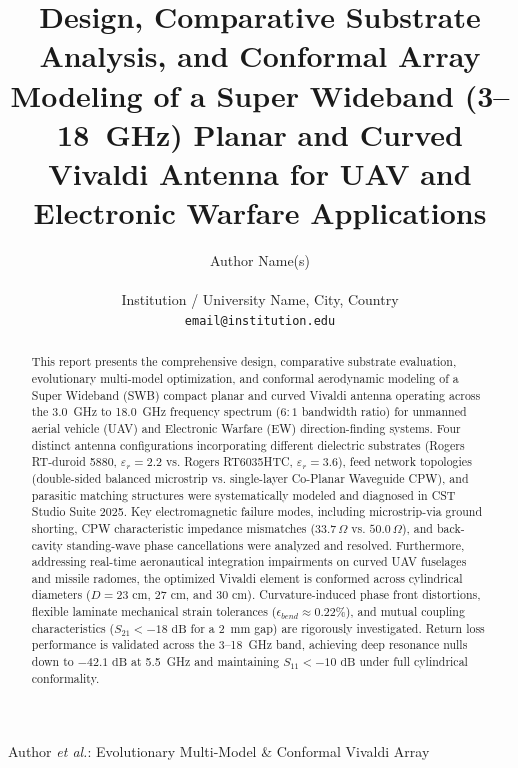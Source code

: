 \documentclass[journal,compsoc,twocolumn,10pt]{IEEEtran}
\begin{document}
\title{Design, Comparative Substrate Analysis, and Conformal Array Modeling of a Super Wideband (3--18~GHz) Planar and Curved Vivaldi Antenna for UAV and Electronic Warfare Applications}

\author{Author Name(s) \\
 \\
Institution / University Name, City, Country \\
\texttt{email@institution.edu}
}

%
{Author \MakeLowercase{\textit{et al.}}: Evolutionary Multi-Model & Conformal Vivaldi Array}

\maketitle

\begin{abstract}
This report presents the comprehensive design, comparative substrate evaluation, evolutionary multi-model optimization, and conformal aerodynamic modeling of a Super Wideband (SWB) compact planar and curved Vivaldi antenna operating across the 3.0~GHz to 18.0~GHz frequency spectrum ($6:1$ bandwidth ratio) for unmanned aerial vehicle (UAV) and Electronic Warfare (EW) direction-finding systems. Four distinct antenna configurations incorporating different dielectric substrates (Rogers RT-duroid 5880, $\varepsilon_r = 2.2$ vs. Rogers RT6035HTC, $\varepsilon_r = 3.6$), feed network topologies (double-sided balanced microstrip vs. single-layer Co-Planar Waveguide CPW), and parasitic matching structures were systematically modeled and diagnosed in CST Studio Suite 2025. Key electromagnetic failure modes, including microstrip-via ground shorting, CPW characteristic impedance mismatches ($33.7\,\Omega$ vs. $50.0\,\Omega$), and back-cavity standing-wave phase cancellations were analyzed and resolved. Furthermore, addressing real-time aeronautical integration impairments on curved UAV fuselages and missile radomes, the optimized Vivaldi element is conformed across cylindrical diameters ($D = 23\text{ cm}$, $27\text{ cm}$, and $30\text{ cm}$). Curvature-induced phase front distortions, flexible laminate mechanical strain tolerances ($\epsilon_{bend} \approx 0.22\%$), and mutual coupling characteristics ($S_{21} < -18\text{ dB}$ for a 2~mm gap) are rigorously investigated. Return loss performance is validated across the 3--18~GHz band, achieving deep resonance nulls down to $-42.1\text{ dB}$ at 5.5~GHz and maintaining $S_{11} < -10\text{ dB}$ under full cylindrical conformality.
\end{abstract}
\end{document}

